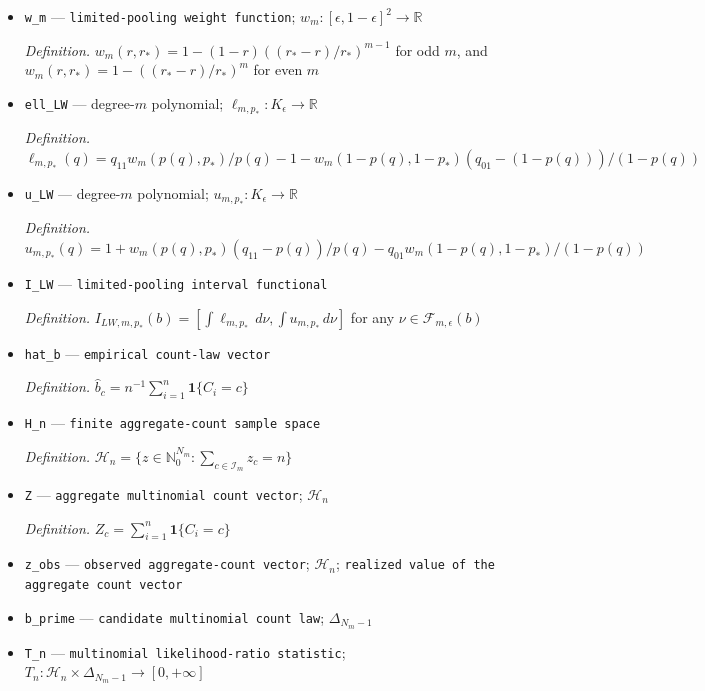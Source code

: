 \documentclass{article}
\begin{document}
\begin{itemize}
  \item \texttt{w\_\allowbreak{}m} --- \texttt{limited-\allowbreak{}pooling weight function}; \(w_m:[\epsilon,1-\epsilon]^2\to\mathbb R\)
  \par\smallskip\noindent\emph{Definition.} \(w_m(r,r_*)=1-(1-r)((r_*-r)/r_*)^{m-1}\) for odd \(m\), and \(w_m(r,r_*)=1-((r_*-r)/r_*)^m\) for even \(m\)
  \item \texttt{ell\_\allowbreak{}LW} --- degree-\(m\) polynomial; \(\ell_{m,p_*}:K_{\epsilon}\to\mathbb R\)
  \par\smallskip\noindent\emph{Definition.} \(\ell_{m,p_*}(q)=q_{11}w_m(p(q),p_*)/p(q)-1-w_m(1-p(q),1-p_*)(q_{01}-(1-p(q)))/(1-p(q))\)
  \item \texttt{u\_\allowbreak{}LW} --- degree-\(m\) polynomial; \(u_{m,p_*}:K_{\epsilon}\to\mathbb R\)
  \par\smallskip\noindent\emph{Definition.} \(u_{m,p_*}(q)=1+w_m(p(q),p_*)(q_{11}-p(q))/p(q)-q_{01}w_m(1-p(q),1-p_*)/(1-p(q))\)
  \item \texttt{I\_\allowbreak{}LW} --- \texttt{limited-\allowbreak{}pooling interval functional}
  \par\smallskip\noindent\emph{Definition.} \(I_{LW,m,p_*}(b)=[\int\ell_{m,p_*}\,d\nu,\int u_{m,p_*}\,d\nu]\) for any \(\nu\in\mathcal F_{m,\epsilon}(b)\)
  \item \texttt{hat\_\allowbreak{}b} --- \texttt{empirical count-\allowbreak{}law vector}
  \par\smallskip\noindent\emph{Definition.} \(\widehat b_c=n^{-1}\sum_{i=1}^n\mathbf 1\{C_i=c\}\)
  \item \texttt{H\_\allowbreak{}n} --- \texttt{finite aggregate-\allowbreak{}count sample space}
  \par\smallskip\noindent\emph{Definition.} \(\mathcal H_n=\{z\in\mathbb N_0^{N_m}:\sum_{c\in\mathcal I_m}z_c=n\}\)
  \item \texttt{Z} --- \texttt{aggregate multinomial count vector}; \(\mathcal H_n\)
  \par\smallskip\noindent\emph{Definition.} \(Z_c=\sum_{i=1}^n\mathbf 1\{C_i=c\}\)
  \item \texttt{z\_\allowbreak{}obs} --- \texttt{observed aggregate-\allowbreak{}count vector}; \(\mathcal H_n\); \texttt{realized value of the aggregate count vector}
  \item \texttt{b\_\allowbreak{}prime} --- \texttt{candidate multinomial count law}; \(\Delta_{N_m-1}\)
  \item \texttt{T\_\allowbreak{}n} --- \texttt{multinomial likelihood-\allowbreak{}ratio statistic}; \(T_n:\mathcal H_n\times\Delta_{N_m-1}\to[0,+\infty]\)

\end{itemize}
\end{document}
